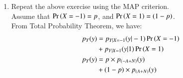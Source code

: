 \documentclass[journal,12pt,twocolumn]{IEEEtran}
\renewcommand\thesection{\arabic{section}}
\begin{document}
\begin{enumerate}[label=\thesection.\arabic*
,ref=\thesection.\theenumi]
\begin{enumerate}[label=\thesection.\arabic*
,ref=\thesection.\theenumi]
\begin{align}
    &= p Q_N(A - \delta) + (1-p)Q_N(A + \delta)
\intertext{Differentiating as before, we get:}
0 &= p \frac{1}{\sqrt{2\pi}} e^{-\frac{(\delta - A)^2}{2}} - (1-p)\frac{1}{\sqrt{2\pi}} e^{-\frac{(A + \delta)^2}{2}} 
\end{align}
 \begin{align}
e^{\frac{{(\delta +A)}^2-{((\delta -A))}^2}{2}}=\frac{1-p}{p}\\
\implies \boxed{\delta=0}
 \end{align}
    \item Repeat the above exercise using the MAP criterion.
\\
\solution
Assume that $\Pr\left(X = -1\right) = p$, and $\Pr\left(X = 1\right) = (1-p)$.\\
From Total Probability Theorem,
we have:
\begin{align}
\nonumber p_Y(y) &= p_{Y|X = -1}(y|-1) \Pr\left(X = -1\right) \\
&+ p_{Y| X = 1}(y|1) \Pr\left(X = 1\right) \\
p_Y(y) &=  p \times p_{(-A + N)}(y) \\
&+ (1-p) \times p_{(A+N)} (y) 
\end{align}
 

\end{enumerate}
\end{enumerate}
\end{document}
